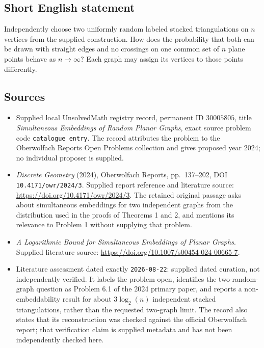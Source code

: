 \documentclass[11pt]{article}
\begin{document}
\subsection{Short English statement}
Independently choose two uniformly random labeled stacked triangulations on \(n\) vertices from the supplied construction. How does the probability that both can be drawn with straight edges and no crossings on one common set of \(n\) plane points behave as \(n\to\infty\)? Each graph may assign its vertices to those points differently.
\subsection{Sources}
\begin{itemize}
\item Supplied local UnsolvedMath registry record, permanent ID \(30005805\), title \emph{Simultaneous Embeddings of Random Planar Graphs}, exact source problem code \texttt{catalogue entry}. The record attributes the problem to the Oberwolfach Reports Open Problems collection and gives proposed year 2024; no individual proposer is supplied.
\item \emph{Discrete Geometry} (2024), Oberwolfach Reports, pp.\ 137--202, DOI \texttt{10.4171/owr/2024/3}. Supplied report reference and literature source: \url{https://doi.org/10.4171/owr/2024/3}. The retained original passage asks about simultaneous embeddings for two independent graphs from the distribution used in the proofs of Theorems 1 and 2, and mentions its relevance to Problem 1 without supplying that problem.
\item \emph{A Logarithmic Bound for Simultaneous Embeddings of Planar Graphs}. Supplied literature source: \url{https://doi.org/10.1007/s00454-024-00665-7}.
\item Literature assessment dated exactly \texttt{2026-08-22}: supplied dated curation, not independently verified. It labels the problem open, identifies the two-random-graph question as Problem 6.1 of the 2024 primary paper, and reports a non-embeddability result for about \(3\log_2(n)\) independent stacked triangulations, rather than the requested two-graph limit. The record also states that its reconstruction was checked against the official Oberwolfach report; that verification claim is supplied metadata and has not been independently checked here.
\end{itemize}
\end{document}
